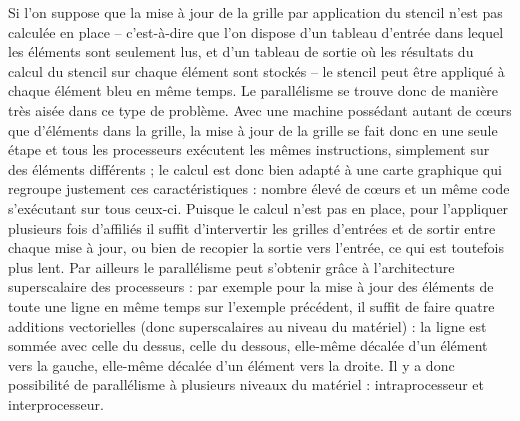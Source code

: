 Si l'on suppose que la mise à jour de la grille par application du stencil n'est pas calculée en place -- c'est-à-dire que l'on dispose d'un tableau d'entrée dans lequel les éléments sont seulement lus, et d'un tableau de sortie où les résultats du calcul du stencil sur chaque élément sont stockés -- le stencil peut être appliqué à chaque élément bleu en même temps. Le parallélisme se trouve donc de manière très aisée dans ce type de problème. Avec une  machine possédant autant de cœurs que d'éléments dans la grille, la mise à jour de la grille se fait donc en une seule étape et tous les processeurs exécutent les mêmes instructions, simplement sur des éléments différents ; le calcul est donc bien adapté à une carte graphique qui regroupe justement ces caractéristiques : nombre élevé de cœurs et un même code s'exécutant sur tous ceux-ci. Puisque le calcul n'est pas en place, pour l'appliquer plusieurs fois d'affiliés il suffit d'intervertir les grilles d'entrées et de sortir entre chaque mise à jour, ou bien de recopier la sortie vers l'entrée, ce qui est toutefois plus lent. Par ailleurs le parallélisme peut s'obtenir grâce à l'architecture superscalaire des processeurs : par exemple pour la mise à jour des éléments de toute une ligne en même temps sur l'exemple précédent, il suffit de faire quatre additions vectorielles (donc superscalaires au niveau du matériel) : la ligne est sommée avec celle du dessus, celle du dessous, elle-même décalée d'un élément vers la gauche, elle-même décalée d'un élément vers la droite. Il y a donc possibilité de parallélisme à plusieurs niveaux du matériel : intraprocesseur et interprocesseur.

